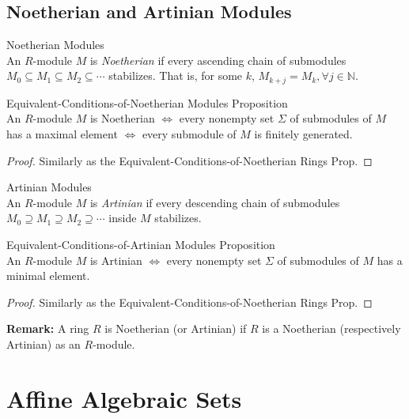 \subsection{Noetherian and Artinian Modules}

\begin{definition}{Noetherian Modules}\\
An $R$-module $M$ is \textit{Noetherian} if every ascending chain of submodules $M_0 \subseteq M_1 \subseteq M_2 \subseteq \cdots$ stabilizes. That is, for some $k$, $M_{k+j} =M_k, \forall j\in \mathbb{N}$.
\end{definition}

\begin{proposition}{Equivalent-Conditions-of-Noetherian Modules Proposition}\\
An $R$-module $M$ is Noetherian $\Leftrightarrow$ every nonempty set $\Sigma$ of submodules of $M$ has a maximal element $\Leftrightarrow$ every submodule of $M$ is finitely generated.
\end{proposition}

\begin{proof}
    Similarly as the Equivalent-Conditions-of-Noetherian Rings Prop.
\end{proof}

\begin{definition}{Artinian Modules}\\
An $R$-module $M$ is \textit{Artinian} if every descending chain of submodules $M_0 \supseteq M_1 \supseteq M_2 \supseteq \cdots$ inside $M$ stabilizes.
\end{definition}

\begin{proposition}{Equivalent-Conditions-of-Artinian Modules Proposition}\\
An $R$-module $M$ is Artinian $\Leftrightarrow$ every nonempty set $\Sigma$ of submodules of $M$ has a minimal element.
\end{proposition}

\begin{proof}
    Similarly as the Equivalent-Conditions-of-Noetherian Rings Prop.
\end{proof}

\noindent\textbf{Remark:} A ring $R$ is Noetherian (or Artinian) if $R$ is a Noetherian (respectively Artinian) as an $R$-module.

\section{Affine Algebraic Sets}

